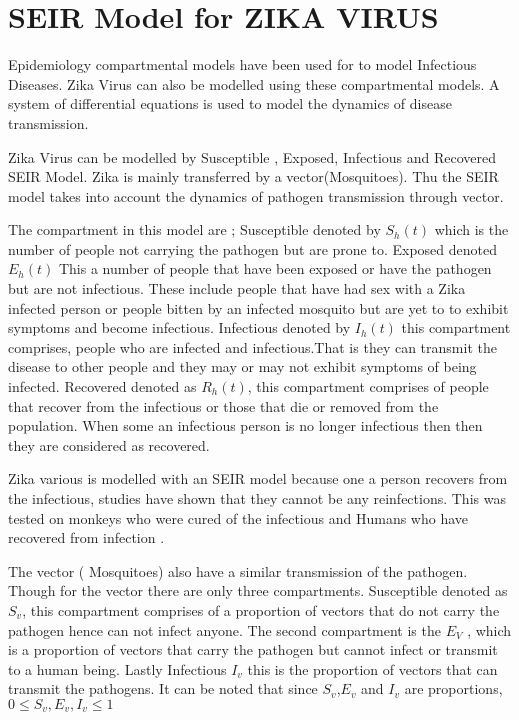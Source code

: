 \chapter{SEIR Model for ZIKA VIRUS}

Epidemiology compartmental models have been used for to model Infectious Diseases. Zika Virus can also be modelled using these compartmental models. A system of differential equations is used to model the dynamics of disease transmission.

Zika Virus can be modelled by Susceptible , Exposed, Infectious and Recovered SEIR Model. Zika is mainly transferred by a vector(Mosquitoes). Thu the SEIR model takes into account the dynamics of pathogen transmission through vector.

The compartment in this model are ; Susceptible denoted by $S_h(t)$ which is the number of people not carrying the pathogen but are prone to. Exposed denoted $E_h(t)$ This a number of people that have been exposed or have the pathogen but are not infectious. These include people that have had sex with a Zika infected person or people bitten by an infected mosquito but are yet to to exhibit symptoms and become infectious. Infectious denoted by $I_h(t)$ this compartment  comprises, people who are infected and infectious.That is they can transmit the disease to other people and they may or may not exhibit symptoms of being infected. Recovered denoted as $R_h(t)$, this compartment comprises of people that recover from the infectious or those that die or removed from the population. When some an infectious person is no longer infectious then then they are considered as recovered.

Zika various is modelled with an SEIR model because one a person recovers from the infectious, studies have shown that they cannot be any reinfections. This was tested on monkeys who were cured of the infectious and Humans who have recovered from infection \citep{posen2016epidemiology}.

The vector ( Mosquitoes) also have a similar transmission of the pathogen. Though for the vector there are only three compartments. Susceptible denoted as $S_v$, this compartment comprises of a proportion of vectors that do not carry the pathogen hence can not infect anyone. The second compartment is the $E_V$ , which is a proportion of vectors that carry the pathogen but cannot infect or transmit to a human being. Lastly Infectious $I_v$ this is the proportion of vectors that can transmit the pathogens. It can be noted that since $S_v$,$E_v$ and $I_v$ are proportions, $ 0 \le S_v,E_v , I_v \le 1$ 

